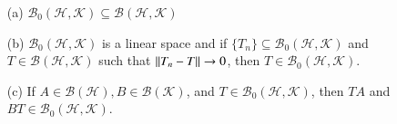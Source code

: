 \begin{prop}
    \begin{enumerate}
        \item[(a)] $\mathscr{B}_0(\mathscr{H},\mathscr{K}) \subseteq \mathscr{B}(\mathscr{H},\mathscr{K})$
        \item[(b)] $\mathscr{B}_0(\mathscr{H},\mathscr{K})$ is a linear space and if $\{T_n\} \subseteq \mathscr{B}_0(\mathscr{H},\mathscr{K})$ and $T \in \mathscr{B}(\mathscr{H},\mathscr{K})$ such that $\left|\left| T_n-T\right|\right| \rightarrow 0$, then $T \in \mathscr{B}_0(\mathscr{H},\mathscr{K})$.
        \item[(c)] If $A\in\mathscr{B}(\mathscr{H}),B \in \mathscr{B}(\mathscr{K})$, and $T \in \mathscr{B}_0(\mathscr{H},\mathscr{K})$, then $TA$ and $BT \in \mathscr{B}_0(\mathscr{H},\mathscr{K})$.
    \end{enumerate}
\end{prop}
